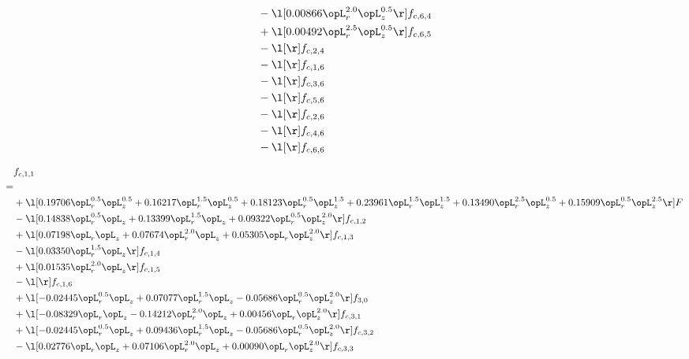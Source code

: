 \begin{alignat}{2}
& - \l[  0.00866 \opL_r^{2.0} \opL_z^{0.5}  \r] f_{c,6,4} \nonumber \\ 
& + \l[  0.00492 \opL_r^{2.5} \opL_z^{0.5}  \r] f_{c,6,5} \nonumber \\ 
& - \l[  \r] f_{c,2,4} \nonumber \\ 
& - \l[  \r] f_{c,1,6} \nonumber \\ 
& - \l[  \r] f_{c,3,6} \nonumber \\ 
& - \l[  \r] f_{c,5,6} \nonumber \\ 
& - \l[  \r] f_{c,2,6} \nonumber \\ 
& - \l[  \r] f_{c,4,6} \nonumber \\ 
& - \l[  \r] f_{c,6,6} \nonumber \\ 
\end{alignat} 


\begin{alignat}{2} 
\label{eq:f_11_2} 
& f_{c,1,1} \nonumber \\ 
 = \\ 
& + \l[  0.19706 \opL_r^{0.5} \opL_z^{0.5} +  0.16217 \opL_r^{1.5} \opL_z^{0.5} +  0.18123 \opL_r^{0.5} \opL_z^{1.5} +  0.23961 \opL_r^{1.5} \opL_z^{1.5} +  0.13490 \opL_r^{2.5} \opL_z^{0.5} +  0.15909 \opL_r^{0.5} \opL_z^{2.5}  \r] F \nonumber \\ 
& - \l[  0.14838 \opL_r^{0.5} \opL_z +  0.13399 \opL_r^{1.5} \opL_z +  0.09322 \opL_r^{0.5} \opL_z^{2.0}  \r] f_{c,1,2} \nonumber \\ 
& + \l[  0.07198 \opL_r \opL_z +  0.07674 \opL_r^{2.0} \opL_z +  0.05305 \opL_r \opL_z^{2.0}  \r] f_{c,1,3} \nonumber \\ 
& - \l[  0.03350 \opL_r^{1.5} \opL_z  \r] f_{c,1,4} \nonumber \\ 
& + \l[  0.01535 \opL_r^{2.0} \opL_z  \r] f_{c,1,5} \nonumber \\ 
& - \l[  \r] f_{c,1,6} \nonumber \\ 
& + \l[  -0.02445 \opL_r^{0.5} \opL_z +  0.07077 \opL_r^{1.5} \opL_z   -0.05686 \opL_r^{0.5} \opL_z^{2.0}  \r] f_{3,0} \nonumber \\ 
& + \l[  -0.08329 \opL_r \opL_z   -0.14212 \opL_r^{2.0} \opL_z +  0.00456 \opL_r \opL_z^{2.0}  \r] f_{c,3,1} \nonumber \\ 
& + \l[  -0.02445 \opL_r^{0.5} \opL_z +  0.09436 \opL_r^{1.5} \opL_z   -0.05686 \opL_r^{0.5} \opL_z^{2.0}  \r] f_{c,3,2} \nonumber \\ 
& - \l[  0.02776 \opL_r \opL_z +  0.07106 \opL_r^{2.0} \opL_z +  0.00090 \opL_r \opL_z^{2.0}  \r] f_{c,3,3} \nonumber \\ 

\end{alignat}
